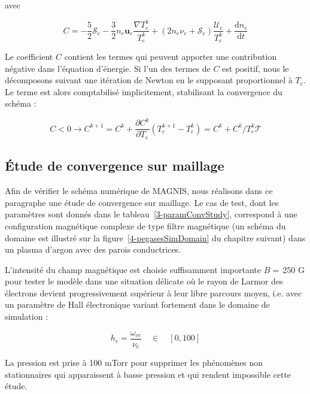 \begin{refsection}
avec 

\begin{equation*}C=-\frac{5}{2}\mathcal S_e-\frac{3}{2}n_e\mathbf
u_e\frac{\nabla
T_e^k}{T_e^k}+(2n_e\nu_e+\mathcal{S}_e)\frac{\mathcal{U}_e}{T_e^k} +\frac{\text{d} n_e}{\text{d} t}
\end{equation*}

Le coefficient $C$ contient les termes qui peuvent apporter une contribution
négative dans l'équation d'énergie. Si l'un des
termes de $C$ est positif, nous le décomposons suivant une itération de
Newton en le supposant proportionnel à $T_e$. Le terme est alors comptabilisé
implicitement, stabilisant la convergence du schéma
\parencite{HagelaarImpl} :

\begin{equation*}
	C<0\rightarrow C^{k+1}=C^{k}+\frac{\partial C^k}{\partial
	T_e}(T_e^{k+1}-T_e^k)=C^{k}+ C^k/T_e^k\mathcal T
\end{equation*}

\subsection{Étude de convergence sur maillage} 
Afin de vérifier le schéma numérique de MAGNIS, nous réalisons dans ce
paragraphe une étude de convergence sur maillage. Le cas de test, dont les paramètres sont donnés dans le
tableau~\ref{3-paramConvStudy}, correspond à une configuration magnétique
complexe de type filtre magnétique (un schéma du domaine est illustré sur la
figure~\ref{4-pegasesSimDomain} du chapitre suivant) dans un plasma
d'argon avec des parois conductrices.

L'intensité du champ magnétique est choisie suffisamment importante $B=\,$250 G
pour tester le modèle dans une situation délicate où le rayon de Larmor des
électrons devient progressivement supérieur à leur libre parcours moyen, i.e.
avec un paramètre de Hall électronique variant fortement dans le domaine de
simulation :

\begin{equation}
h_e=\frac{\omega_{ce}}{\nu_e}\quad\in\quad \left[0,100\right]
\end{equation}

La pression est prise à 100 mTorr pour supprimer les phénomènes non stationnaires qui apparaissent à basse
pression et qui rendent impossible cette étude. 


\end{refsection}

